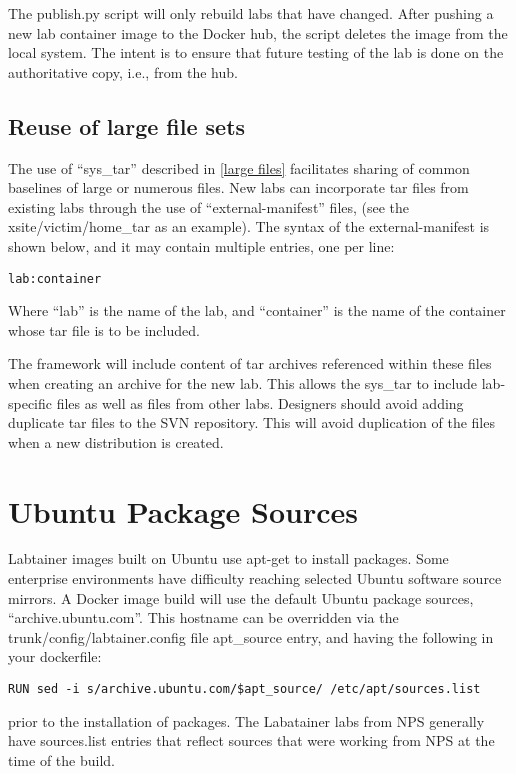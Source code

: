 \documentclass[12pt]{article}
\begin{document}
The publish.py script will only rebuild labs that have changed.  After pushing a new lab container
image to the Docker hub, the script deletes the image from the local system.  The intent is to
ensure that future testing of the lab is done on the authoritative copy, i.e., from the hub.

\subsection{Reuse of large file sets}
The use of ``sys\_tar'' described in \ref{large files} facilitates sharing of common
baselines of large or numerous files.  New labs can incorporate tar files from existing
labs through the use of ``external-manifest'' files, (see the xsite/victim/home\_tar as
an example).   The syntax of the external-manifest is shown below, and it may contain
multiple entries, one per line:
\begin{verbatim}
lab:container
\end{verbatim}
\noindent Where ``lab'' is the name of the lab, and ``container'' is the name of the container
whose tar file is to be included.

The framework will include content of tar archives referenced within these files
when creating an archive for the new lab.  This allows the sys\_tar to include lab-specific files
as well as files from other labs.  Designers should avoid adding duplicate tar files to the SVN repository.
This will avoid duplication of the files when a new distribution is created.

\section{Ubuntu Package Sources}
Labtainer images built on Ubuntu use apt-get to install packages.  Some enterprise environments have 
difficulty reaching selected Ubuntu software source mirrors.  A Docker image build will use the default 
Ubuntu package sources, ``archive.ubuntu.com''.  This hostname can be overridden via the 
trunk/config/labtainer.config file apt\_source entry, and having the following in your dockerfile:
\begin{verbatim}
RUN sed -i s/archive.ubuntu.com/$apt_source/ /etc/apt/sources.list
\end{verbatim}
\noindent prior to the installation of packages.  The Labatainer labs from NPS 
generally have sources.list entries that reflect sources that were working from NPS at the time of the build.
\end{document}
